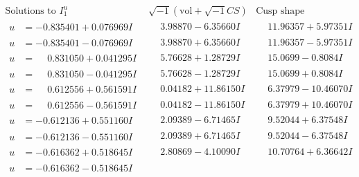 \documentclass[1p]{elsarticle_modified}
\theoremstyle{definition}
\newcommand{\I}{\sqrt{-1}}
\begin{document}
$$\begin{array}{c|c|c}  
\text{Solutions to }I^u_{1}& \I (\text{vol} + \sqrt{-1}CS) & \text{Cusp shape}\\
 \hline 
\begin{aligned}
u &= -0.835401 + 0.076969 I\end{aligned}
 & \phantom{-}3.98870 - 6.35660 I & \phantom{-}11.96357 + 5.97351 I \\ \hline\begin{aligned}
u &= -0.835401 - 0.076969 I\end{aligned}
 & \phantom{-}3.98870 + 6.35660 I & \phantom{-}11.96357 - 5.97351 I \\ \hline\begin{aligned}
u &= \phantom{-}0.831050 + 0.041295 I\end{aligned}
 & \phantom{-}5.76628 + 1.28729 I & \phantom{-}15.0699 - 0.8084 I \\ \hline\begin{aligned}
u &= \phantom{-}0.831050 - 0.041295 I\end{aligned}
 & \phantom{-}5.76628 - 1.28729 I & \phantom{-}15.0699 + 0.8084 I \\ \hline\begin{aligned}
u &= \phantom{-}0.612556 + 0.561591 I\end{aligned}
 & \phantom{-}0.04182 + 11.86150 I & \phantom{-}6.37979 - 10.46070 I \\ \hline\begin{aligned}
u &= \phantom{-}0.612556 - 0.561591 I\end{aligned}
 & \phantom{-}0.04182 - 11.86150 I & \phantom{-}6.37979 + 10.46070 I \\ \hline\begin{aligned}
u &= -0.612136 + 0.551160 I\end{aligned}
 & \phantom{-}2.09389 - 6.71465 I & \phantom{-}9.52044 + 6.37548 I \\ \hline\begin{aligned}
u &= -0.612136 - 0.551160 I\end{aligned}
 & \phantom{-}2.09389 + 6.71465 I & \phantom{-}9.52044 - 6.37548 I \\ \hline\begin{aligned}
u &= -0.616362 + 0.518645 I\end{aligned}
 & \phantom{-}2.80869 - 4.10090 I & \phantom{-}10.70764 + 6.36642 I \\ \hline\begin{aligned}
u &= -0.616362 - 0.518645 I\end{aligned}

\end{array}$$
\end{document}

